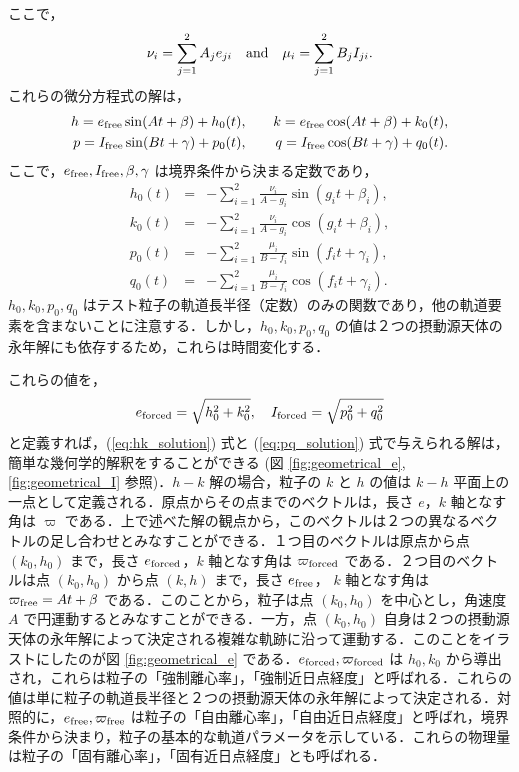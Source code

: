 \documentclass[11pt,a4paper,oneside,onecolumn]{jreport}
\begin{document}
ここで，
\begin{equation}
\nu_i = \sum_{j = 1}^2 A_j e_{ji} \quad {\rm and} \quad \mu_i = \sum_{j=1}^2 B_j I_{ji}. \label{eq:nu_mu}
\end{equation}
これらの微分方程式の解は，
\begin{eqnarray}
h = e_{\rm free} \sin (A t + \beta) + h_0 (t), & \quad & k = e_{\rm free} \cos (A t + \beta) + k_0 (t), \label{eq:hk_solution} \\
p = I_{\rm free} \sin (B t + \gamma) + p_0 (t), & \quad & q = I_{\rm free} \cos (B t + \gamma) + q_0 (t). \label{eq:pq_solution}
\end{eqnarray}
ここで，$e_{\rm free}, I_{\rm free}, \beta, \gamma$ は境界条件から決まる定数であり，
\begin{eqnarray}
h_0 (t) & = & - \sum_{i = 1}^2 \frac{\nu_i}{A - g_i} \sin (g_i t + \beta_i), \label{eq:h_0} \\
k_0 (t) & = & - \sum_{i = 1}^2 \frac{\nu_i}{A - g_i} \cos (g_i t + \beta_i), \label{eq:k_0} \\
p_0 (t) & = & - \sum_{i = 1}^2 \frac{\mu_i}{B - f_i} \sin (f_i t + \gamma_i), \label{eq:p_0} \\
q_0 (t) & = & - \sum_{i = 1}^2 \frac{\mu_i}{B - f_i} \cos (f_i t + \gamma_i). \label{eq:q_0} 
\end{eqnarray}
$h_0, k_0, p_0, q_0$ はテスト粒子の軌道長半径（定数）のみの関数であり，他の軌道要素を含まないことに注意する．しかし，$h_0, k_0, p_0, q_0$ の値は２つの摂動源天体の永年解にも依存するため，これらは時間変化する．

これらの値を，
\begin{equation}
e_{\rm forced} = \sqrt{h_0^2 + k_0^2}, \quad I_{\rm forced} = \sqrt{p_0^2 + q_0^2} \label{eq:forced}
\end{equation}
と定義すれば，(\ref{eq:hk_solution}) 式と (\ref{eq:pq_solution}) 式で与えられる解は，簡単な幾何学的解釈をすることができる (図 \ref{fig:geometrical_e}, \ref{fig:geometrical_I} 参照)．$h - k$ 解の場合，粒子の $k$ と $h$ の値は $k - h$ 平面上の一点として定義される．原点からその点までのベクトルは，長さ $e$，$k$ 軸となす角は $\varpi$ である．上で述べた解の観点から，このベクトルは２つの異なるベクトルの足し合わせとみなすことができる．１つ目のベクトルは原点から点 $(k_0, h_0)$ まで，長さ $e_{\rm forced}$，$k$ 軸となす角は $\varpi_{\rm forced}$ である．２つ目のベクトルは点 $(k_0, h_0)$ から点 $(k, h)$ まで，長さ $e_{\rm free}$， $k$ 軸となす角は $\varpi_{\rm free} = A t + \beta$ である．このことから，粒子は点 $(k_0, h_0)$ を中心とし，角速度 $A$ で円運動するとみなすことができる．一方，点 $(k_0, h_0)$ 自身は２つの摂動源天体の永年解によって決定される複雑な軌跡に沿って運動する．このことをイラストにしたのが図 \ref{fig:geometrical_e} である．$e_{\rm forced}, \varpi_{\rm forced}$ は $h_0, k_0$ から導出され，これらは粒子の「強制離心率」，「強制近日点経度」と呼ばれる．これらの値は単に粒子の軌道長半径と２つの摂動源天体の永年解によって決定される．対照的に，$e_{\rm free}, \varpi_{\rm free}$ は粒子の「自由離心率」，「自由近日点経度」と呼ばれ，境界条件から決まり，粒子の基本的な軌道パラメータを示している．これらの物理量は粒子の「固有離心率」，「固有近日点経度」とも呼ばれる．
\end{document}
